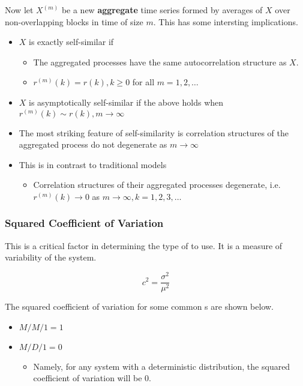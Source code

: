 Now let $X^{(m)}$ be a new \textbf{aggregate} time series formed by averages of $X$ over non-overlapping blocks in time of size $m$.
This has some intersting implications.
\begin{itemize}[noitemsep]
\item $X$ is exactly self-similar if
  \begin{itemize}[noitemsep]
  \item The aggregated processes have the same autocorrelation structure as $X$.
  \item $r^{(m)}(k) = r(k), k \geq 0$ for all $m = 1, 2, \ldots$
  \end{itemize}

\item $X$ is asymptotically self-similar if the above holds when $r^{(m)}(k) \sim r(k), m \to \infty$
\item The most striking feature of self-similarity is correlation structures of the aggregated process do not degenerate as $m \to \infty$
\item This is in contrast to traditional models
  \begin{itemize}[noitemsep]
  \item Correlation structures of their aggregated processes degenerate, i.e.\ $r^{(m)}(k) \to 0$ as $m \to \infty, k = 1, 2, 3, \ldots$
  \end{itemize}
\end{itemize}

\subsubsection{Squared Coefficient of Variation}\label{subsubsec:Squared_Coefficient_Variation}
This is a critical factor in determining the type of  to use.
It is a measure of variability of the system.

\begin{equation}\label{eq:Squared_Coefficient_Variation}
  c^{2} = \frac{\sigma^{2}}{\mu^{2}}
\end{equation}

The squared coefficient of variation for some common s are shown below.
\begin{itemize}[noitemsep]
\item $M/M/1 = 1$
\item $M/D/1 = 0$
  \begin{itemize}[noitemsep]
  \item Namely, for any system with a deterministic distribution, the squared coefficient of variation will be 0.
  \end{itemize}
\end{itemize}

